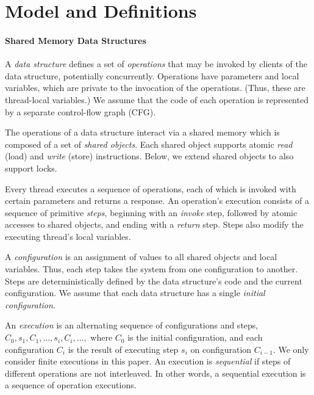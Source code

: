\section{Model and Definitions}\label{sec:model}



\paragraph{Shared Memory Data Structures}

A \emph{data structure} defines a set of \emph{operations} that may be invoked by
clients of the data structure, potentially concurrently.
%
Operations have parameters and local variables, which are private to the invocation of the operations.
(Thus, these are thread-local variables.)
%
We assume that the code of each operation is represented by a separate control-flow graph (CFG).

The operations of a data structure interact via a shared memory which is composed of a set of \emph{shared objects}.
%
Each shared object supports atomic \emph{read} (load) and \emph{write} (store) instructions.
%
Below, we extend shared objects to also support locks.

Every thread executes a sequence of operations, each of which is invoked with certain parameters and returns a response.
An operation's execution consists of a sequence of primitive \emph{steps}, beginning with an \emph{invoke} step, followed by
atomic accesses to shared objects, and ending with a \emph{return} step. Steps also modify the executing thread's local variables.

A \emph{configuration} is an assignment of values to all shared objects and local variables. Thus, each step takes the system from one
configuration to another. Steps are deterministically defined by the data structure's code and the current configuration.
We assume that each data structure has a single \emph{initial configuration}.

An \emph{execution} is an alternating sequence of configurations and steps,
$C_0,s_1,C_1, \ldots,s_i,C_i,\ldots,$
where $C_0$ is the initial configuration,
and each configuration $C_i$ is the result of
executing step $s_i$ on configuration $C_{i-1}$.
We only consider finite executions in this paper.
An execution is \emph{sequential} if steps of different operations are not interleaved.
In other words, a sequential execution is a sequence of operation executions.

